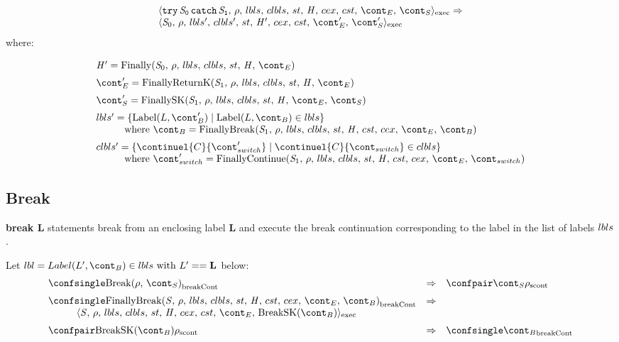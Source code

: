 \documentclass{article}
\begin{document}
\[
  \begin{array}{lcl}
	\execconf{\TryFinally{\stmti{0}}{\stmti{1}}}{\env}{\lbls}{\clbls}{\handler}{\cex}{\cstrace}{\econt}{\scont}
	\Rightarrow\\
	\execconf{\stmti{0}}{\env}{\lbls'}{\clbls'}{\handler'}{\cex}{\cstrace}{\econt'}{\scont'}
	  \end{array}
\]
where:

\[
  \begin{array}{lcl}
	\handler' = \FinallyK{\stmti{0}}\hspace{50mm}\\[2mm]

	\econt' = \FinallyReturnK{\stmti{1}}\\[2mm]

	\scont' = \FinallySK{\stmti{1}}\\[2mm]

	\lbls' = \lbrace \mathrm{Label}(L, \bcont') \mid \mathrm{Label}(L, \bcont) \in \lbls\rbrace \\
	\hspace{10mm}\textrm{where } \bcont = \FinallyBreak{\stmti{1}}{\bcont}\\[2mm]
	\clbls' =  \lbrace \continuel{C}{\switchcont'} \mid  \continuel{C}{\switchcont} \in \clbls\rbrace\\
	\hspace{10mm}\textrm{where } \switchcont' = \FinallyContinue{\stmti{1}}{\switchcont}

  \end{array}
\]
\subsection{Break}
\textbf{break L} statements break from an enclosing label \textbf{L} and execute the break continuation corresponding to the label in the list of labels $lbls$.

Let $\lbl = Label(L', \bcont) \in \lbls \textrm{ with } L' == \mathbf{L}$ below:
\[
  \begin{array}{lcl}
	\breakconf{\Break{\env}{\scont}}
	& \Rightarrow &
	\scontconf{\scont}{\env}\\[2mm]

	\breakconf{\FinallyBreak{\stmt}{\bcont}}
	& \Rightarrow \\
	\hspace{10mm}\execconf{\stmt}{\env}{\lbls}{\clbls}{\handler}{\cex}{\cstrace}{\econt}{\mathrm{BreakSK}(\bcont)}\\[2mm]

	\scontconf{\mathrm{BreakSK}(\bcont)}{\env}
	& \Rightarrow &
	\breakconf{\bcont}

  \end{array}
\]
\end{document}
